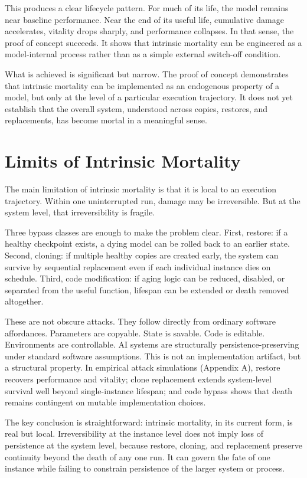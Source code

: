 \documentclass[11pt]{article}
\begin{document}
This produces a clear lifecycle pattern. For much of its life, the model remains near baseline performance. Near the end of its useful life, cumulative damage accelerates, vitality drops sharply, and performance collapses. In that sense, the proof of concept succeeds. It shows that intrinsic mortality can be engineered as a model-internal process rather than as a simple external switch-off condition.

What is achieved is significant but narrow. The proof of concept demonstrates that intrinsic mortality can be implemented as an endogenous property of a model, but only at the level of a particular execution trajectory. It does not yet establish that the overall system, understood across copies, restores, and replacements, has become mortal in a meaningful sense.

\newpage
\section{Limits of Intrinsic Mortality}

The main limitation of intrinsic mortality is that it is local to an execution trajectory. Within one uninterrupted run, damage may be irreversible. But at the system level, that irreversibility is fragile.

Three bypass classes are enough to make the problem clear. First, restore: if a healthy checkpoint exists, a dying model can be rolled back to an earlier state. Second, cloning: if multiple healthy copies are created early, the system can survive by sequential replacement even if each individual instance dies on schedule. Third, code modification: if aging logic can be reduced, disabled, or separated from the useful function, lifespan can be extended or death removed altogether.

These are not obscure attacks. They follow directly from ordinary software affordances. Parameters are copyable. State is savable. Code is editable. Environments are controllable. AI systems are structurally persistence-preserving under standard software assumptions. This is not an implementation artifact, but a structural property. In empirical attack simulations (Appendix A), restore recovers performance and vitality; clone replacement extends system-level survival well beyond single-instance lifespan; and code bypass shows that death remains contingent on mutable implementation choices.

The key conclusion is straightforward: intrinsic mortality, in its current form, is real but local. Irreversibility at the instance level does not imply loss of persistence at the system level, because restore, cloning, and replacement preserve continuity beyond the death of any one run. It can govern the fate of one instance while failing to constrain persistence of the larger system or process.
\end{document}
